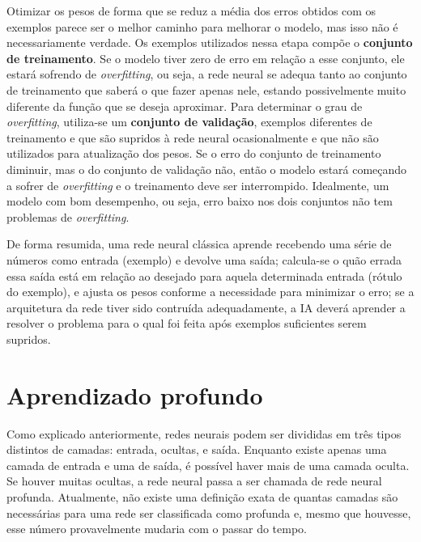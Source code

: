 Otimizar os pesos de forma que se reduz a média dos erros obtidos com os exemplos parece ser o melhor caminho para melhorar o modelo, mas isso não é necessariamente verdade.
Os exemplos utilizados nessa etapa compõe o \textbf{conjunto de treinamento}.
Se o modelo tiver zero de erro em relação a esse conjunto, ele estará sofrendo de \textit{overfitting}, ou seja, a rede neural se adequa tanto ao conjunto de treinamento que saberá o que fazer apenas nele, estando possivelmente muito diferente da função que se deseja aproximar.
Para determinar o grau de \textit{overfitting}, utiliza-se um \textbf{conjunto de validação}, exemplos diferentes de treinamento e que são supridos à rede neural ocasionalmente e que não são utilizados para atualização dos pesos.
Se o erro do conjunto de treinamento diminuir, mas o do conjunto de validação não, então o modelo estará começando a sofrer de \textit{overfitting} e o treinamento deve ser interrompido.
Idealmente, um modelo com bom desempenho, ou seja, erro baixo nos dois conjuntos não tem problemas de \textit{overfitting}.

De forma resumida, uma rede neural clássica aprende recebendo uma série de números como entrada (exemplo) e devolve uma saída;
calcula-se o quão errada essa saída está em relação ao desejado para aquela determinada entrada (rótulo do exemplo), e ajusta os pesos conforme a necessidade para minimizar o erro;
se a arquitetura da rede tiver sido contruída adequadamente, a IA deverá aprender a resolver o problema para o qual foi feita após exemplos suficientes serem supridos.


\section{Aprendizado profundo}
\label{sec:dl}

Como explicado anteriormente, redes neurais podem ser divididas em três tipos distintos de camadas: entrada, ocultas, e saída.
Enquanto existe apenas uma camada de entrada e uma de saída, é possível haver mais de uma camada oculta.
Se houver muitas ocultas, a rede neural passa a ser chamada de rede neural profunda.
Atualmente, não existe uma definição exata de quantas camadas são necessárias para uma rede ser classificada como profunda e, mesmo que houvesse, esse número provavelmente mudaria com o passar do tempo.

